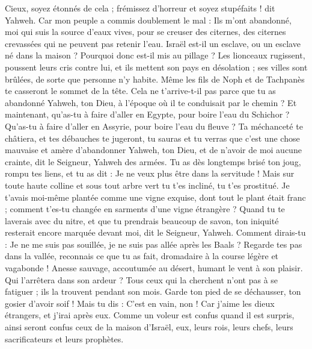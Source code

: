 \begin{multicols}{2}
Cieux, soyez étonnés de cela ; frémissez d'horreur et soyez stupéfaits ! dit Yahweh.
Car mon peuple a commis doublement le mal : Ils m'ont abandonné, moi qui suis la source d'eaux vives, pour se creuser des citernes, des citernes crevassées qui ne peuvent pas retenir l'eau.
Israël est-il un esclave, ou un esclave né dans la maison ? Pourquoi donc est-il mis au pillage ?
Les lionceaux rugissent, poussent leurs cris contre lui, et ils mettent son pays en désolation ; ses villes sont brûlées, de sorte que personne n'y habite.
Même les fils de Noph et de Tachpanès te casseront le sommet de la tête.
Cela ne t'arrive-t-il pas parce que tu as abandonné Yahweh, ton Dieu, à l'époque où il te conduisait par le chemin ?
Et maintenant, qu'as-tu à faire d'aller en Egypte, pour boire l'eau du Schichor ? Qu'as-tu à faire d'aller en Assyrie, pour boire l'eau du fleuve ?
Ta méchanceté te châtiera, et tes débauches te jugeront, tu sauras et tu verras que c'est une chose mauvaise et amère d'abandonner Yahweh, ton Dieu, et de n'avoir de moi aucune crainte, dit le Seigneur, Yahweh des armées.
Tu as dès longtemps brisé ton joug, rompu tes liens, et tu as dit : Je ne veux plus être dans la servitude ! Mais sur toute haute colline et sous tout arbre vert tu t'es incliné, tu t'es prostitué.
Je t'avais moi-même plantée comme une vigne exquise, dont tout le plant était franc ; comment t'es-tu changée en sarments d'une vigne étrangère ?
Quand tu te laverais avec du nitre, et que tu prendrais beaucoup de savon, ton iniquité resterait encore marquée devant moi, dit le Seigneur, Yahweh.
Comment dirais-tu : Je ne me suis pas souillée, je ne suis pas allée après les Baals ? Regarde tes pas dans la vallée, reconnais ce que tu as fait, dromadaire à la course légère et vagabonde !
Anesse sauvage, accoutumée au désert, humant le vent à son plaisir. Qui l'arrêtera dans son ardeur ? Tous ceux qui la cherchent n'ont pas à se fatiguer ; ils la trouvent pendant son mois.
Garde ton pied de se déchausser, ton gosier d'avoir soif ! Mais tu dis : C'est en vain, non ! Car j'aime les dieux étrangers, et j'irai après eux.
Comme un voleur est confus quand il est surpris, ainsi seront confus ceux de la maison d'Israël, eux, leurs rois, leurs chefs, leurs sacrificateurs et leurs prophètes.

\end{multicols}
